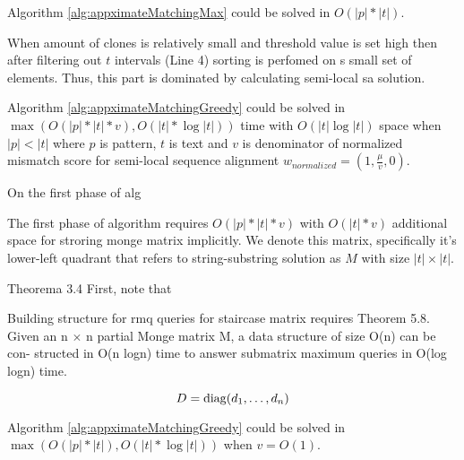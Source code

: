 \begin{corollary}
Algorithm \ref{alg:appximateMatchingMax} could  be solved in 
$O(|p| * |t|)$.

When amount of clones is relatively small and threshold value is set high  then after filtering out $t$ intervals (Line 4) sorting is perfomed on s small set of elements.
Thus, this part is dominated by calculating semi-local sa solution.
\end{corollary}




\begin{theorem}
Algorithm \ref{alg:appximateMatchingGreedy} could  be solved in 
$\max ( O(|p| * |t| * v), O(|t| * \log |t|))$ time with $ O(|t| \log |t|)$ space when $|p|<|t|$ where $p$ is pattern, $t$ is text and $v$ is denominator of normalized mismatch score for semi-local sequence alignment
$w_{normalized} = (1,\frac{\mu}{v},0)$.

On the first phase of alg

The first phase of algorithm requires $O(|p| * |t| * v)$ with $O(|t| * v)$ additional space for stroring monge matrix implicitly.
We denote this matrix, specifically it's lower-left quadrant that refers to
string-substring solution as $M$ with size $|t| \times |t|$.


  Theorema 3.4
First, note that 

Building structure for rmq queries for staircase matrix requires 
Theorem 5.8. Given an n $\times$ n partial Monge matrix M, a data structure of size O(n) can be con-
structed in O(n logn) time to answer submatrix maximum queries in O(log logn) time.
   

\begin{displaymath}
    D = \operatorname{diag}(d_1,\dots,d_n)
  \end{displaymath}
\end{theorem}


\begin{corollary}
Algorithm \ref{alg:appximateMatchingGreedy} could  be solved in 
$\max ( O(|p| * |t|), O(|t| * \log |t|))$ when $v = O(1)$.

\end{corollary}




  


 
